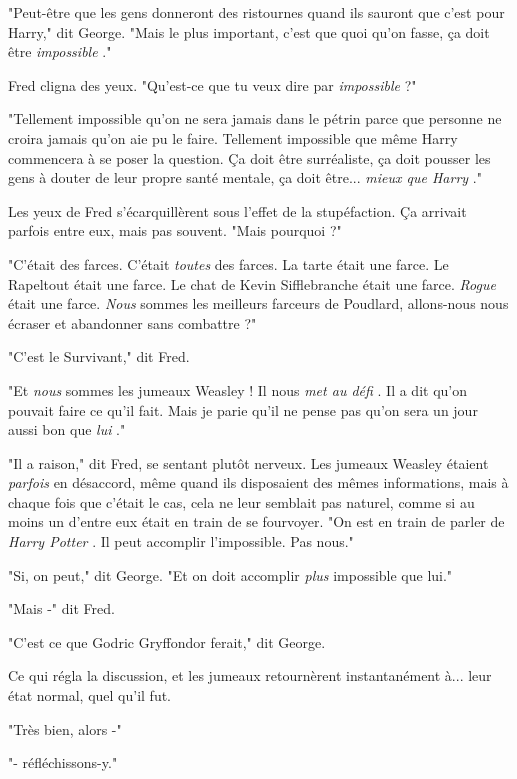 "Peut-être que les gens donneront des ristournes quand ils sauront que c'est pour Harry," dit George. "Mais le plus important, c'est que quoi qu'on fasse, ça doit être \emph{impossible} ."

Fred cligna des yeux. "Qu'est-ce que tu veux dire par \emph{impossible} ?"

"Tellement impossible qu'on ne sera jamais dans le pétrin parce que personne ne croira jamais qu'on aie pu le faire. Tellement impossible que même Harry commencera à se poser la question. Ça doit être surréaliste, ça doit pousser les gens à douter de leur propre santé mentale, ça doit être... \emph{mieux que Harry} ."

Les yeux de Fred s'écarquillèrent sous l'effet de la stupéfaction. Ça arrivait parfois entre eux, mais pas souvent. "Mais pourquoi ?"

"C'était des farces. C'était \emph{toutes}  des farces. La tarte était une farce. Le Rapeltout était une farce. Le chat de Kevin Sifflebranche était une farce. \emph{Rogue}  était une farce. \emph{Nous} sommes les meilleurs farceurs de Poudlard, allons-nous nous écraser et abandonner sans combattre ?"

"C'est le Survivant," dit Fred.

"Et \emph{nous}  sommes les jumeaux Weasley ! Il nous \emph{met au défi} . Il a dit qu'on pouvait faire ce qu'il fait. Mais je parie qu'il ne pense pas qu'on sera un jour aussi bon que \emph{lui} ."

"Il a raison," dit Fred, se sentant plutôt nerveux. Les jumeaux Weasley étaient \emph{parfois}  en désaccord, même quand ils disposaient des mêmes informations, mais à chaque fois que c'était le cas, cela ne leur semblait pas naturel, comme si au moins un d'entre eux était en train de se fourvoyer. "On est en train de parler de \emph{Harry Potter} . Il peut accomplir l'impossible. Pas nous."

"Si, on peut," dit George. "Et on doit accomplir \emph{plus} impossible que lui."

"Mais -" dit Fred.

"C'est ce que Godric Gryffondor ferait," dit George.

Ce qui régla la discussion, et les jumeaux retournèrent instantanément à... leur état normal, quel qu'il fut.

"Très bien, alors -"

"- réfléchissons-y."

